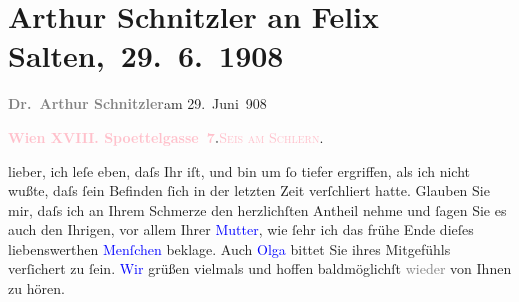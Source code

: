 

\renewcommand{\erwaehntePersonen}{Personen: Felix Salten, Michael Emil Salzmann, Marie Salzmann, Olga Schnitzler}
\renewcommand{\erwaehnteOrte}{Orte: Edmund-Weiß-Gasse 7, Seis am Schlern, Wien}
\renewcommand{\erwaehnteWerke}{}
\section[ Arthur Schnitzler an Felix Salten, 29. 6. 1908]{Arthur Schnitzler an Felix Salten, 29. 6. 1908}
\nopagebreak{}
\rehead{ }\normalsize\beginnumbering{}
\toendnotes[C]{\smallbreak\pagebreak[2]}
\toendnotes[C]{\smallbreak}
\pstart
           \noindent{}{\pb}\textcolor{gray}{\textbf{Dr. Arthur Schnitzler}}\hfill am 29. Juni 908\pend
           
\pstart
           \textcolor{gray}{\textbf{\textcolor{pink}{Wien XVIII. Spoettelgasse 7}{}\ledrightnote{\textcolor{pink}{Edmund-Weiß-Gasse 7}}.}}\hfill \textsc{\textcolor{pink}{Seis am Schlern}{}\ledrightnote{\textcolor{pink}{Seis am Schlern}}}.\pend
           
\pstart
           lieber, ich leſe eben, daſs Ihr \label{K_L03014-1v}\label{K_L03014-1h} iſt,
               und bin um ſo tiefer ergriffen, als ich nicht wußte, daſs ſein Befinden ſich in der
               letzten Zeit verſchli{\geminationm}ert hatte. Glauben Sie mir, daſs
               ich an Ihrem Schmerze den herzlichſten Antheil nehme und ſagen Sie es auch den
               Ihrigen, vor allem Ihrer \textcolor{blue}{Mutter}{}\ledrightnote{{$\rightarrow$}\textcolor{blue}{Marie Salzmann}}, wie ſehr ich das {\pb}frühe Ende
               dieſes liebenswerthen \textcolor{blue}{Menſchen}{}\ledrightnote{{$\rightarrow$}\textcolor{blue}{Michael Emil Salzmann}} beklage. Auch \textcolor{blue}{Olga}{}\ledrightnote{\textcolor{blue}{Olga Schnitzler}} bittet Sie
               ihres Mitgefühls verſichert zu ſein. \textcolor{blue}{Wir}{}\ledrightnote{{$\rightarrow$}\textcolor{blue}{Olga Schnitzler}} grüßen vielmals und hoffen baldmöglichſt
                  \textcolor{gray}{wieder} von Ihnen zu hören.\pend
           
